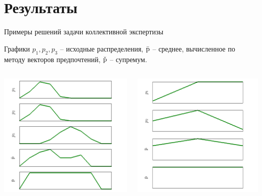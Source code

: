  
\section{Результаты}
\begin{frame}{Примеры решений задачи  коллективной экспертизы}
  \vspace{-2ex}
  \begin{center}
    Графики $p_1, p_2, p_3$ -- исходные распределения, $\bar{{\mathrm{p}}}$ -- среднее, вычисленное по методу векторов предпочтений, $\check{{\mathrm{p}}}$ -- супремум. 
  \end{center} 
  \vspace{-3ex}
  \begin{columns}
	  \begin{center}
	      \includegraphics[width=0.9\linewidth]{./pic/prefsup102}
	  \end{center}
          \begin{center}
	      \includegraphics[width=1\linewidth]{./pic/prefsup6}

\end{center}
\end{columns}
\end{frame}

